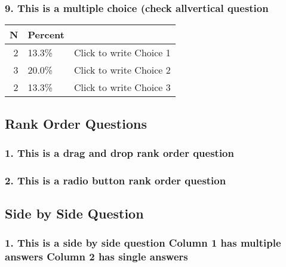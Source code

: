 \documentclass{article}\usepackage[]{graphicx}\usepackage[]{color}
\begin{document}
\hfill \break \hfill \break
\subsubsection*{9.
This is a multiple choice (check allvertical question}

\begin{tabular}{r|l|l}
\hline
N & Percent & \\
\hline
2 & 13.3\% & Click to write Choice 1\\
\hline
3 & 20.0\% & Click to write Choice 2\\
\hline
2 & 13.3\% & Click to write Choice 3\\
\hline
\end{tabular}


\hfill \break \hfill \break
\subsection*{Rank Order Questions}
\subsubsection*{1.
This is a drag and drop rank order question}

\hfill \break \hfill \break
\subsubsection*{2.
This is a radio button rank order question}

\hfill \break \hfill \break
\subsection*{Side by Side Question}
\subsubsection*{1.
This is a side by side question Column 1 has multiple answers Column 2 has single answers}

\hfill \break \hfill \break
\end{document}
